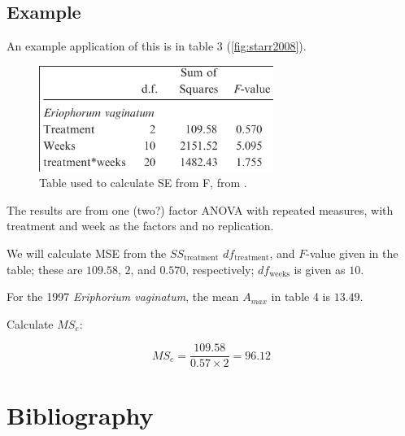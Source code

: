 \documentclass[12pt,english,portrait]{article}
\begin{document}
\subsection{Example}

An example application of this is in \cite{starr2008pra} table 3 (\autoref{fig:starr2008}).  

\begin{figure}
  \includegraphics[width=3in]{starr2008.png}
  \caption{Table used to calculate SE from F, from \cite{starr2008pra}.} 
  \label{fig:starr2008}
\end{figure}

The results are from one (two?) factor ANOVA with repeated measures, with treatment and week as the factors and no replication.

We will calculate MSE from the $SS_{\text{treatment}}$ $df_{\text{treatment}}$, and $F$-value given in the table; these are $109.58$, $2$, and $0.570$, respectively; $df_{\text{weeks}}$ is given as $10$.

For the 1997 \textit{Eriphorium vaginatum}, the mean $A_{max}$ in table 4 is $13.49$.

Calculate $MS_e$: 

$$MS_e = \frac{109.58}{0.57 \times 2} = 96.12$$

\section{Bibliography}


\end{document}
